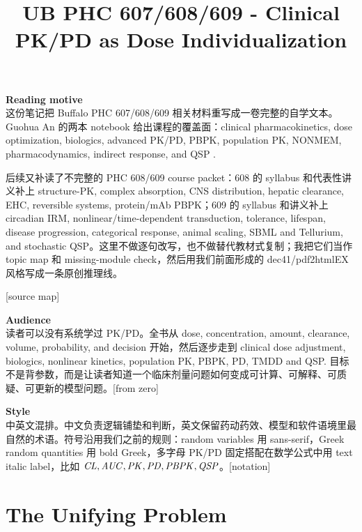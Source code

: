 \documentclass[a4paper]{article}
\title{UB PHC 607/608/609 - Clinical PK/PD as Dose Individualization}
\newcommand{\pkCL}{\pksym{CL}}
\newcommand{\pkAUC}{\pksym{AUC}}
\newcommand{\pkPD}{\pksym{PD}}
\newcommand{\pkPK}{\pksym{PK}}
\newcommand{\pkPBPK}{\pksym{PBPK}}
\newcommand{\pkQSP}{\pksym{QSP}}
\begin{document}
\maketitle
{\small\sloppy
  \noindent\textbf{Reading motive}\\
  这份笔记把 Buffalo PHC 607/608/609 相关材料重写成一卷完整的自学文本。Guohua An 的两本 notebook 给出课程的覆盖面：clinical pharmacokinetics, dose optimization, biologics, advanced PK/PD, PBPK, population PK, NONMEM, pharmacodynamics, indirect response, and QSP \cite{an2025essentialsClinicalPK,an2025advancedPKPD}.

  后续又补读了不完整的 PHC 608/609 course packet：608 的 syllabus 和代表性讲义补上 structure-PK, complex absorption, CNS distribution, hepatic clearance, EHC, reversible systems, protein/mAb PBPK；609 的 syllabus 和讲义补上 circadian IRM, nonlinear/time-dependent transduction, tolerance, lifespan, disease progression, categorical response, animal scaling, SBML and Tellurium, and stochastic QSP。这里不做逐句改写，也不做替代教材式复制；我把它们当作 topic map 和 missing-module check，然后用我们前面形成的 dec41/pdf2htmlEX 风格写成一条原创推理线。\par\hfill[source map]

  \vspace{5pt}
  \noindent\textbf{Audience}\\
  读者可以没有系统学过 PK/PD。全书从 dose, concentration, amount, clearance, volume, probability, and decision 开始，然后逐步走到 clinical dose adjustment, biologics, nonlinear kinetics, population PK, PBPK, PD, TMDD and QSP. 目标不是背参数，而是让读者知道一个临床剂量问题如何变成可计算、可解释、可质疑、可更新的模型问题。\hspace*{\fill}[from zero]

  \vspace{5pt}
  \noindent\textbf{Style}\\
  中英文混排。中文负责逻辑铺垫和判断，英文保留药动药效、模型和软件语境里最自然的术语。符号沿用我们之前的规则：random variables 用 sans-serif，Greek random quantities 用 bold Greek，多字母 PK/PD 固定搭配在数学公式中用 text italic label，比如 \(\pkCL,\pkAUC,\pkPK,\pkPD,\pkPBPK,\pkQSP\)。\hspace*{\fill}[notation]
}

\tableofcontents

\section{The Unifying Problem}
\end{document}
